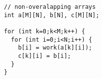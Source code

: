 \begin{lstlisting}[morekeywords={g_qCount},belowskip=0pt]
// non-overalapping arrays
int a[M][N], b[N], c[M][N];

for (int k=0;k<M;k++) {
  for (int i=0;i<N;i++) {
    b[i] = work(a[k][i]);
    c[k][i] = b[i];
  }
}
\end{lstlisting}
